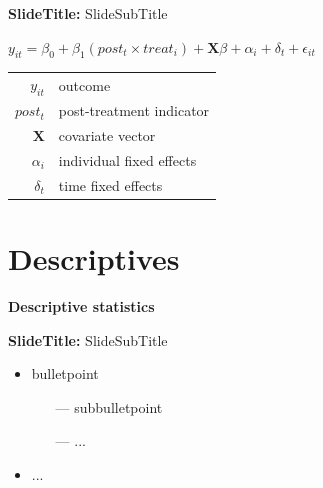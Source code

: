\documentclass{beamer} %
\begin{document}
\begin{frame}{\textbf{SlideTitle:} SlideSubTitle}
    \begin{centering}
        {$y_{it} = \beta_{0} + \beta_{1} (post_{t}\times treat_{i}) + \pmb{X}\beta+ \alpha_{i} + \delta_{t} + \epsilon_{it}$}\\
    \end{centering}
    \vspace{.5cm}
    \begin{footnotesize}
        \hspace{2cm}\begin{tabular}{ r l }
            $y_{it}$ & outcome \\ 
            $post_{t}$ & post-treatment indicator\\
            $\pmb{X}$ & covariate vector\\
            $\alpha_{i}$ & individual fixed effects\\
            $\delta_{t}$ & time fixed effects
        \end{tabular}
    \end{footnotesize}
\end{frame}

\section{Descriptives}
{
	\begin{frame}[plain]		
    	\vspace{1cm}
    	{\color{white}\LARGE \textbf{Descriptive statistics}}
    \end{frame}
    \addtocounter{framenumber}{-1}
}


\begin{frame}[label=descr]{\textbf{SlideTitle:} SlideSubTitle}
	\begin{itemize}
	    \item bulletpoint
    	\begin{itemize}
    	    \item[---] subbulletpoint
    	    \item[---] ...
    	\end{itemize}
    	\item ...
	\end{itemize}
	\hspace{\fill}\hyperlink{appendix}{}
\end{frame}
\end{document}
